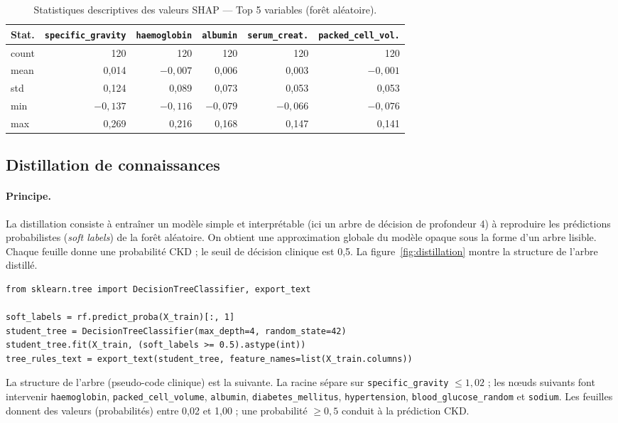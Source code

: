 \begin{table}[H]
\centering
\caption{Statistiques descriptives des valeurs SHAP — Top 5 variables (forêt aléatoire).}
\label{tab:shap-rf-top5}
\small
\begin{tabular}{lrrrrr}
\hline
\textbf{Stat.} & \texttt{specific\_gravity} & \texttt{haemoglobin} & \texttt{albumin} & \texttt{serum\_creat.} & \texttt{packed\_cell\_vol.} \\
\hline
count & 120 & 120 & 120 & 120 & 120 \\
mean  & 0{,}014 & $-0{,}007$ & 0{,}006 & 0{,}003 & $-0{,}001$ \\
std   & 0{,}124 & 0{,}089 & 0{,}073 & 0{,}053 & 0{,}053 \\
min   & $-0{,}137$ & $-0{,}116$ & $-0{,}079$ & $-0{,}066$ & $-0{,}076$ \\
max   & 0{,}269 & 0{,}216 & 0{,}168 & 0{,}147 & 0{,}141 \\
\hline
\end{tabular}
\end{table}

\subsection{Distillation de connaissances}
\label{ssec:cas3-distillation}

\paragraph{Principe.}
La distillation consiste à entraîner un modèle simple et interprétable (ici un arbre de décision de profondeur 4) à reproduire les prédictions probabilistes (\emph{soft labels}) de la forêt aléatoire. On obtient une approximation globale du modèle opaque sous la forme d'un arbre lisible. Chaque feuille donne une probabilité CKD ; le seuil de décision clinique est 0{,}5. La figure~\ref{fig:distillation} montre la structure de l'arbre distillé.

\begin{lstlisting}[style=reportPython]
from sklearn.tree import DecisionTreeClassifier, export_text

soft_labels = rf.predict_proba(X_train)[:, 1]
student_tree = DecisionTreeClassifier(max_depth=4, random_state=42)
student_tree.fit(X_train, (soft_labels >= 0.5).astype(int))
tree_rules_text = export_text(student_tree, feature_names=list(X_train.columns))
\end{lstlisting}

La structure de l'arbre (pseudo-code clinique) est la suivante. La racine sépare sur \texttt{specific\_gravity} $\leq 1{,}02$ ; les nœuds suivants font intervenir \texttt{haemoglobin}, \texttt{packed\_cell\_volume}, \texttt{albumin}, \texttt{diabetes\_mellitus}, \texttt{hypertension}, \texttt{blood\_glucose\_random} et \texttt{sodium}. Les feuilles donnent des valeurs (probabilités) entre 0{,}02 et 1{,}00 ; une probabilité $\geq 0{,}5$ conduit à la prédiction CKD.

